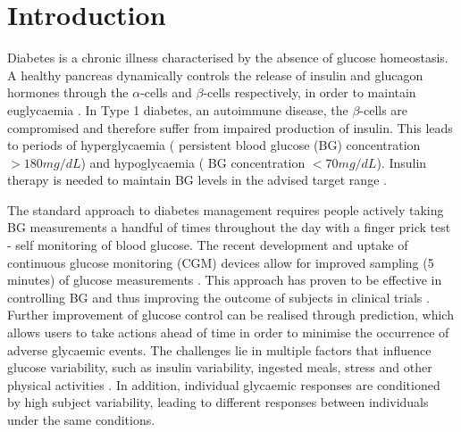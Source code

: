 \documentclass[a4paper, 10 pt, twocolumn]{IEEEtran}
\begin{document}
\linespread{0.97}

\section{Introduction}\label{Section:1}
Diabetes is a chronic illness characterised by the absence of glucose homeostasis. A healthy pancreas dynamically controls the release of insulin and glucagon hormones through the $\alpha$-cells and $\beta$-cells
respectively, in order to maintain euglycaemia \cite{NationalDia-ClassDia1979}. In Type 1 diabetes, an autoimmune disease, the $\beta$-cells are compromised and therefore suffer from impaired production of insulin. This
leads to periods of hyperglycaemia ( persistent blood glucose (BG) concentration $>180 mg/dL$) and hypoglycaemia ( {BG} concentration $< 70 mg/dL$)\cite{Facchinetti-AnOnline2013, Zavitsanou-InSilico2015}. Insulin therapy
is needed to maintain  {BG} levels in the advised target range \cite{Vettoretti-Type1Dia2018}.

 The standard approach to diabetes management requires people actively taking  {BG} measurements a handful of times throughout the day with a finger prick test - self monitoring of blood glucose. The recent development
 and uptake of continuous glucose monitoring (CGM) devices allow for improved sampling (5 minutes) of glucose measurements  { \cite{Ahmadi-AWireless2009}}. {This approach has proven to be effective in controlling BG and
 thus improving the outcome of subjects in clinical trials \cite{Facchinetti-ConGlu2016}. Further improvement of glucose control can be realised through prediction, which allows users to take actions ahead of time in
 order to minimise the occurrence of adverse glycaemic events. The challenges lie in multiple factors that influence glucose variability, such as insulin variability, ingested meals, stress and other physical activities
 \cite{Oviedo-AReview2017}.} In addition, {individual glycaemic responses are conditioned by high subject variability\cite{Vettoretti-Type1Dia2018,Pesl-AnAdvBolus2016}, leading to different responses between individuals
 under the same conditions.}
\end{document}
